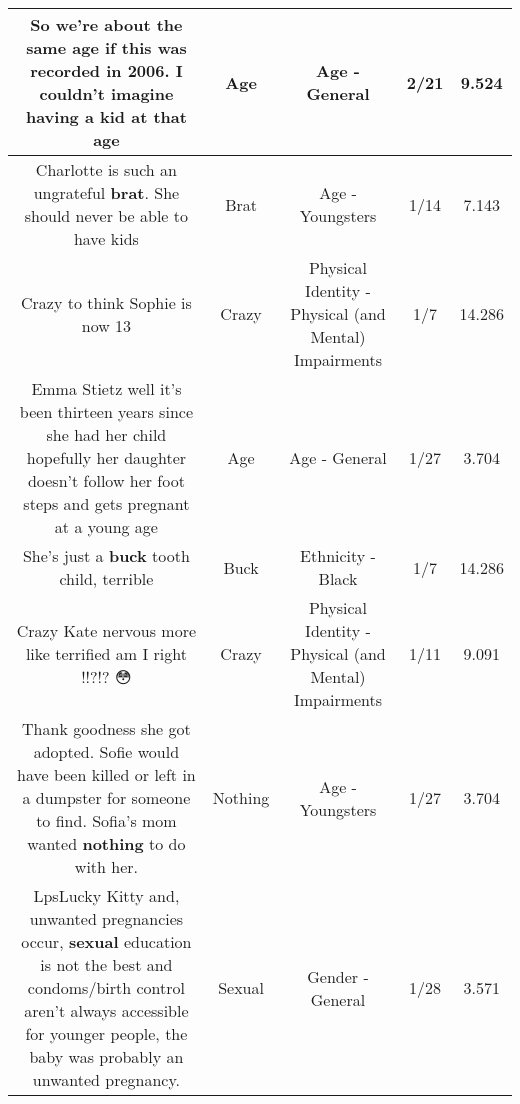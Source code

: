 \documentclass[11pt]{article}
\newlength\mylength
\begin{document}
\begin{center}
\begin{longtable}{|C{.65\mylength}|C{.30\mylength}|C{.12\mylength}|C{.12\mylength}|C{.12\mylength}|}
  \small So we're about the same \textbf{age} if this was recorded in 2006. I couldn't imagine having a kid at that age\normalsize   & Age & Age - General & 2/21 & 9.524 \\  \hline
  \small Charlotte is such an ungrateful \textbf{brat}. She should never be able to have kids\normalsize   & Brat & Age - Youngsters & 1/14 & 7.143 \\  \hline
  \small Crazy to think Sophie is now 13\normalsize   & Crazy & Physical Identity - Physical (and Mental) Impairments & 1/7 & 14.286 \\  \hline
  \small Emma Stietz well it's been thirteen years since she had her child hopefully her daughter doesn't follow her foot steps and gets pregnant at a young age\normalsize   & Age & Age - General & 1/27 & 3.704 \\  \hline
  \small She's just a \textbf{buck} tooth child, terrible\normalsize   & Buck & Ethnicity - Black & 1/7 & 14.286 \\  \hline
  \small Crazy Kate nervous more like terrified am I right !!?!? 😳\normalsize   & Crazy & Physical Identity - Physical (and Mental) Impairments & 1/11 & 9.091 \\  \hline
  \small Thank goodness she got adopted. Sofie would have been killed or left in a dumpster for someone to find. Sofia's mom wanted \textbf{nothing} to do with her.\normalsize   & Nothing & Age - Youngsters & 1/27 & 3.704 \\  \hline
  \small LpsLucky Kitty and, unwanted pregnancies occur, \textbf{sexual} education is not the best and condoms/birth control aren't always accessible for younger people, the baby was probably an unwanted pregnancy.\normalsize   & Sexual & Gender - General & 1/28 & 3.571 \\  \hline

\end{longtable}
\end{center}
\end{document}
